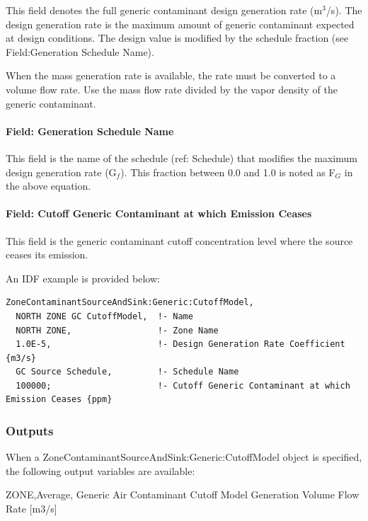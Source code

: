 This field denotes the full generic contaminant design generation rate (m\(^{3}\)/s). The design generation rate is the maximum amount of generic contaminant expected at design conditions. The design value is modified by the schedule fraction (see Field:Generation Schedule Name).

When the mass generation rate is available, the rate must be converted to a volume flow rate. Use the mass flow rate divided by the vapor density of the generic contaminant.

\paragraph{Field: Generation Schedule Name}\label{field-generation-schedule-name-1}

This field is the name of the schedule (ref: Schedule) that modifies the maximum design generation rate (G\(_{f}\)). This fraction between 0.0 and 1.0 is noted as F\(_{G}\) in the above equation.

\paragraph{Field: Cutoff Generic Contaminant at which Emission Ceases}\label{field-cutoff-generic-contaminant-at-which-emission-ceases}

This field is the generic contaminant cutoff concentration level where the source ceases its emission.

An IDF example is provided below:

\begin{lstlisting}
ZoneContaminantSourceAndSink:Generic:CutoffModel,
  NORTH ZONE GC CutoffModel,  !- Name
  NORTH ZONE,                 !- Zone Name
  1.0E-5,                     !- Design Generation Rate Coefficient {m3/s}
  GC Source Schedule,         !- Schedule Name
  100000;                     !- Cutoff Generic Contaminant at which Emission Ceases {ppm}
\end{lstlisting}

\subsubsection{Outputs}\label{outputs-9-003}

When a ZoneContaminantSourceAndSink:Generic:CutoffModel object is specified, the following output variables are available:

ZONE,Average, Generic Air Contaminant Cutoff Model Generation Volume Flow Rate {[}m3/s{]}

